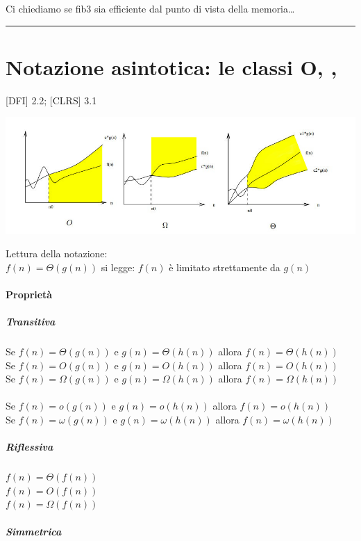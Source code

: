 \documentclass[11pt,a4paper,twoside,openright]{book}
\let\oldparagraph\paragraph
\renewcommand{\paragraph}[1]{\oldparagraph{#1}\mbox{}}
\let\oldsubparagraph\subparagraph
\renewcommand{\subparagraph}[1]{\oldsubparagraph{#1}\mbox{}}
\begin{document}
{{{{Ci chiediamo se fib3 sia efficiente dal punto di vista della
memoria\ldots{}}

\begin{center}\rule{0.5\linewidth}{\linethickness}\end{center}

\section{Notazione asintotica: le classi O, \Omega, \Theta}

{{[}DFI{]} 2.2; {[}CLRS{]} 3.1}

\includegraphics{images/classi_asintotiche.jpg}

Lettura della notazione: \\

$f(n) = \Theta(g(n))$ si legge: $f(n)$ è limitato strettamente da $g(n)$

\paragraph{Proprietà}

\subparagraph{Transitiva}

Se $f(n) = \Theta(g(n))$ e $g(n) = \Theta(h(n))$ allora $f(n) = \Theta(h(n))$ \\
Se $f(n) = O(g(n))$ e $g(n) = O(h(n))$ allora $f(n) = O(h(n))$ \\
Se $f(n) = \Omega(g(n))$ e $g(n) = \Omega(h(n))$ allora $f(n) = \Omega(h(n))$ \\
\\
Se $f(n) = o(g(n))$ e $g(n) = o(h(n))$ allora $f(n) = o(h(n))$ \\
Se $f(n) = \omega(g(n))$ e $g(n) = \omega(h(n))$ allora $f(n) = \omega(h(n))$ 
 

\subparagraph{Riflessiva}

$f(n) = \Theta(f(n))$ \\
$f(n) = O(f(n))$ \\
$f(n) = \Omega(f(n))$ 

\subparagraph{Simmetrica}

}}}
\end{document}
